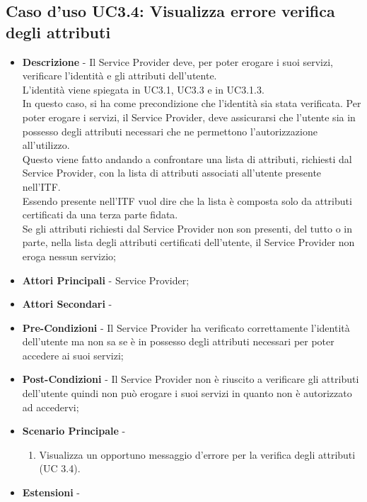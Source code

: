 \subsection{Caso d'uso UC3.4: Visualizza errore verifica degli attributi}
\begin{itemize}
	\item \textbf{Descrizione} - Il Service Provider deve, per poter erogare i suoi servizi, verificare l'identità e gli attributi dell'utente.\\
	L'identità viene spiegata in UC3.1, UC3.3 e in UC3.1.3.\\
	In questo caso, si ha come precondizione che l'identità sia stata verificata.
	Per poter erogare i servizi, il Service Provider, deve assicurarsi che l'utente sia in possesso degli attributi necessari che ne permettono l'autorizzazione all'utilizzo.\\
	Questo viene fatto andando a confrontare una lista di attributi, richiesti dal Service Provider, con la lista di attributi associati all'utente presente nell'\gls{ITF}.\\
	Essendo presente nell'\gls{ITF} vuol dire che la lista è composta solo da attributi certificati da una terza parte fidata.\\
	Se gli attributi richiesti dal Service Provider non son presenti, del tutto o in parte, nella lista degli attributi certificati dell'utente, il Service Provider non eroga nessun servizio;
	\item \textbf{Attori Principali} - Service Provider;
	\item \textbf{Attori Secondari} -
	\item \textbf{Pre-Condizioni} - Il Service Provider ha verificato correttamente l'identità dell'utente ma non sa se è in possesso degli attributi necessari per poter accedere ai suoi servizi;
	\item \textbf{Post-Condizioni} - Il Service Provider non è riuscito a verificare gli attributi dell'utente quindi non può erogare i suoi servizi in quanto non è autorizzato ad accedervi;
	\item \textbf{Scenario Principale} -
	\begin{enumerate}
		\item Visualizza un opportuno messaggio d'errore per la verifica degli attributi (UC 3.4).
	\end{enumerate}
	\item \textbf{Estensioni} -
\end{itemize}
\newpage
